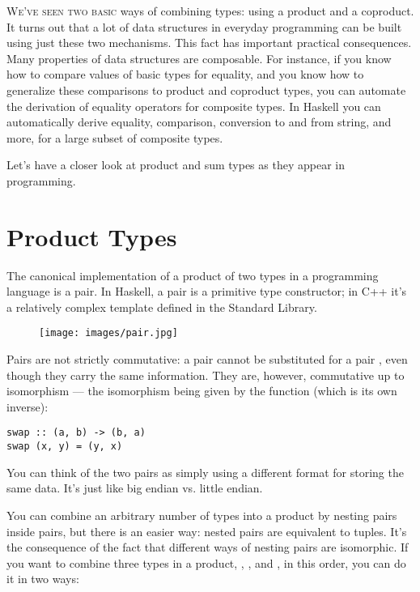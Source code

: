 \lettrine[lhang=0.17]{W}{e've seen two basic} ways of combining types: using a product and a
coproduct. It turns out that a lot of data structures in everyday
programming can be built using just these two mechanisms. This fact has
important practical consequences. Many properties of data structures are
composable. For instance, if you know how to compare values of basic
types for equality, and you know how to generalize these comparisons to
product and coproduct types, you can automate the derivation of equality
operators for composite types. In Haskell you can automatically derive
equality, comparison, conversion to and from string, and more, for a
large subset of composite types.

Let's have a closer look at product and sum types as they appear in
programming.

\section{Product Types}

The canonical implementation of a product of two types in a programming
language is a pair. In Haskell, a pair is a primitive type constructor;
in C++ it's a relatively complex template defined in the Standard
Library.

\begin{figure}
\centering
\texttt{[image: images/pair.jpg]}
\end{figure}

\noindent
Pairs are not strictly commutative: a pair  cannot
be substituted for a pair , even though they carry
the same information. They are, however, commutative up to isomorphism
--- the isomorphism being given by the  function (which is
its own inverse):

\begin{Verbatim}
swap :: (a, b) -> (b, a)
swap (x, y) = (y, x)
\end{Verbatim}
You can think of the two pairs as simply using a different format for
storing the same data. It's just like big endian vs. little endian.

You can combine an arbitrary number of types into a product by nesting
pairs inside pairs, but there is an easier way: nested pairs are
equivalent to tuples. It's the consequence of the fact that different
ways of nesting pairs are isomorphic. If you want to combine three types
in a product, , , and , in this order, you
can do it in two ways:

